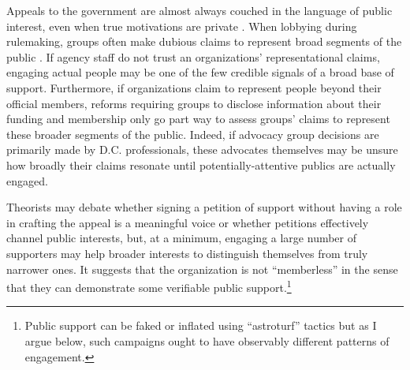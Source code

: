 Appeals to the government are almost always couched in the language of public interest, even when true motivations are private \citep{Schattschneider1975}.
When lobbying during rulemaking, groups often make dubious claims to represent broad segments of the public \citep{Seifter2016UCLA}. %
If agency staff do not trust an organizations' representational claims, engaging actual people may be one of the few credible signals of a broad base of support. Furthermore, if organizations claim to represent people beyond their official members, reforms requiring groups to disclose information about their funding and membership \citep{Seifter2016UCLA} only go part way to assess groups' claims to represent these broader segments of the public. Indeed, if advocacy group decisions are primarily made by D.C. professionals, these advocates themselves may be unsure how broadly their claims resonate until potentially-attentive publics are actually engaged.

 Theorists may debate whether signing a petition of support without having a role in crafting the appeal is a meaningful voice or whether petitions effectively channel public interests, but, at a minimum, engaging a large number of supporters may help broader interests to distinguish themselves from truly narrower ones. It suggests that the organization is not ``memberless'' \citep{Skocpol2003} in the sense that they can demonstrate some verifiable public support.\footnote{
Public support can be faked or inflated using ``astroturf'' tactics but as I argue below, such campaigns ought to have observably different patterns of engagement.}



